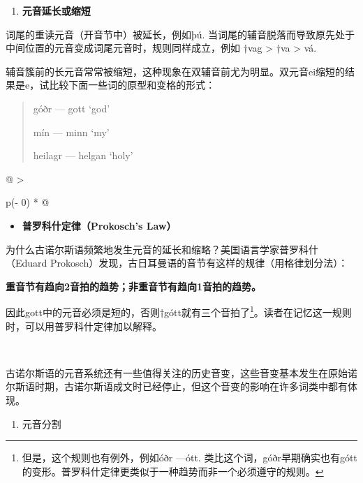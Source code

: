 \begin{enumerate}
\def\labelenumi{\Alph{enumi}.}
\setcounter{enumi}{2}
\item
  \textbf{元音延长或缩短}
\end{enumerate}

词尾的重读元音（开音节中）被延长，例如þú.
当词尾的辅音脱落而导致原先处于中间位置的元音变成词尾元音时，规则同样成立，例如
†vag \textgreater{} †va \textgreater{} vá.

辅音簇前的长元音常常被缩短，这种现象在双辅音前尤为明显。双元音ei缩短的结果是e，试比较下面一些词的原型和变格的形式：

\begin{quote}
góðr --- gott `god'

mín --- minn `my'

heilagr --- helgan `holy'
\end{quote}

\begin{longtable}[]{@{}
  >{\raggedright\arraybackslash}p{(\columnwidth - 0\tabcolsep) * }@{}}
\toprule\noalign{}
\begin{minipage}[b]{\linewidth}\raggedright
\begin{itemize}
\item
  \textbf{普罗科什定律（Prokosch's Law）}
\end{itemize}

为什么古诺尔斯语频繁地发生元音的延长和缩略？美国语言学家普罗科什（Eduard
Prokosch）发现，古日耳曼语的音节有这样的规律（用格律划分法）：

\textbf{重音节有趋向2音拍的趋势；非重音节有趋向1音拍的趋势。}

因此gott中的元音必须是短的，否则†gótt就有三个音拍了\footnote{但是，这个规则也有例外，例如óðr
  ---ótt.
  类比这个词，góðr早期确实也有gótt的变形。普罗科什定律更类似于一种趋势而非一个必须遵守的规则。}。读者在记忆这一规则时，可以用普罗科什定律加以解释。
\end{minipage} \\
\midrule\noalign{}
\endhead
\bottomrule\noalign{}
\endlastfoot
\end{longtable}

古诺尔斯语的元音系统还有一些值得关注的历史音变，这些音变基本发生在原始诺尔斯语时期，古诺尔斯语成文时已经停止，但这个音变的影响在许多词类中都有体现。

\begin{enumerate}
\def\labelenumi{\Alph{enumi}.}
\setcounter{enumi}{3}
\item
  元音分割
\end{enumerate}

